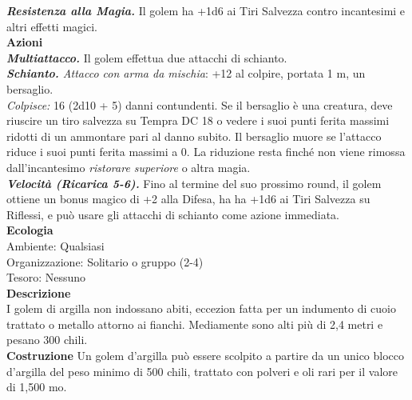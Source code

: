 \begin{multicols}{2}
\emph{\textbf{Resistenza alla Magia.}} Il golem ha +1d6 ai Tiri Salvezza contro incantesimi e altri effetti magici.\\
\smallskip\textbf{Azioni} \\
\emph{\textbf{Multiattacco.}} Il golem effettua due attacchi di schianto.\\
\emph{\textbf{Schianto.} Attacco con arma da mischia}: +12 al colpire, portata 1 m, un bersaglio.\\
\emph{Colpisce:} 16 (2d10 + 5) danni contundenti. Se il bersaglio è una creatura, deve riuscire un tiro salvezza su Tempra DC  18 o vedere i suoi punti ferita massimi ridotti di un ammontare pari al danno subito. Il bersaglio muore se l'attacco riduce i suoi punti ferita massimi a 0. La riduzione resta finché non viene rimossa dall'incantesimo \emph{ristorare superiore} o altra magia.\\
\emph{\textbf{Velocità (Ricarica 5-6).}} Fino al termine del suo prossimo round, il golem ottiene un bonus magico di +2 alla Difesa, ha ha +1d6 ai Tiri Salvezza su Riflessi, e può usare gli attacchi di schianto come azione immediata.\\
\textbf{Ecologia}\\
Ambiente: Qualsiasi\\
Organizzazione: Solitario o gruppo (2-4)\\
Tesoro: Nessuno\\
\textbf{Descrizione}\\
I golem di argilla non indossano abiti, eccezion fatta per un indumento di cuoio trattato o metallo attorno ai fianchi. Mediamente sono alti più di 2,4 metri e pesano 300 chili.\\
\textbf{Costruzione}
Un golem d'argilla può essere scolpito a partire da un unico blocco d'argilla del peso minimo di 500 chili, trattato con polveri e oli rari per il valore di 1,500 mo.\\


\end{multicols}
